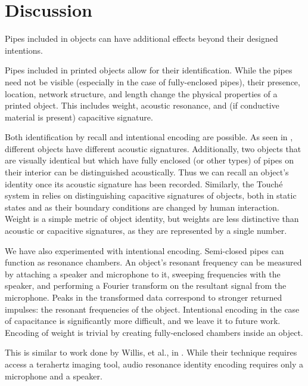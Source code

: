 \section{Discussion}


Pipes included in objects can have additional effects beyond their designed intentions.

Pipes included in printed objects allow for their identification.  While the pipes need not be visible (especially in the case of fully-enclosed pipes), their presence, location, network structure, and length change the physical properties of a printed object.  This includes weight, acoustic resonance, and (if conductive material is present) capacitive signature.

Both identification by recall and intentional encoding are possible.  As seen in \cite{Ono-touchandactivate}, different objects have different acoustic signatures.  Additionally, two objects that are visually identical but which have fully enclosed (or other types) of pipes on their interior can be distinguished acoustically.  Thus we can recall an object's identity once its acoustic signature has been recorded.  Similarly, the Touch\'{e} system in \cite{Sato-touche} relies on distinguishing capacitive signatures of objects, both in static states and as their boundary conditions are changed by human interaction.  Weight is a simple metric of object identity, but weights are less distinctive than acoustic or capacitive signatures, as they are represented by a single number.

We have also experimented with intentional encoding.  Semi-closed pipes can function as resonance chambers.  An object's resonant frequency can be measured by attaching a speaker and microphone to it, sweeping frequencies with the speaker, and performing a Fourier transform on the resultant signal from the microphone.  Peaks in the transformed data correspond to stronger returned impulses: the resonant frequencies of the object.  Intentional encoding in the case of capacitance is significantly more difficult, and we leave it to future work.  Encoding of weight is trivial by creating fully-enclosed chambers inside an object.

This is similar to work done by Willis, et al., in \cite{Willis-infrastructs}.  While their technique requires access a terahertz imaging tool, audio resonance identity encoding requires only a microphone and a speaker.


